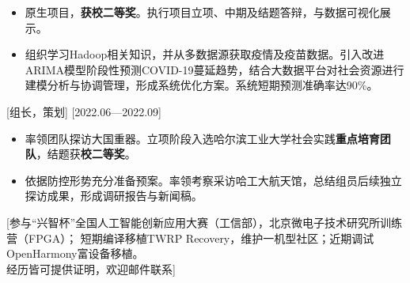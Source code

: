 \documentclass{resume}
\begin{document}
\begin{itemize}
  \item[] 原生项目，\textbf{获校二等奖}。执行项目立项、中期及结题答辩，与数据可视化展示。
  \item[] 组织学习Hadoop相关知识，并从多数据源获取疫情及疫苗数据。引入改进ARIMA模型阶段性预测COVID-19蔓延趋势，结合大数据平台对社会资源进行建模分析与协调管理，形成系统优化方案。系统短期预测准确率达90\%。

\end{itemize}

[组长，策划]
[2022.06—2022.09] 

\begin{itemize}
  \item[] 率领团队探访大国重器。立项阶段入选哈尔滨工业大学社会实践\textbf{重点培育团队}，结题获\textbf{校二等奖}。
  \item[] 依据防控形势充分准备预案。率领考察采访哈工大航天馆，总结组员后续独立探访成果，形成调研报告与新闻稿。

\end{itemize}

[参与“兴智杯”全国人工智能创新应用大赛（工信部），北京微电子技术研究所训练营（FPGA）；\hspace*{2.6em} 短期编译移植TWRP Recovery，维护一机型社区；近期调试OpenHarmony富设备移植。\\经历皆可提供证明，欢迎邮件联系]
\end{document}
